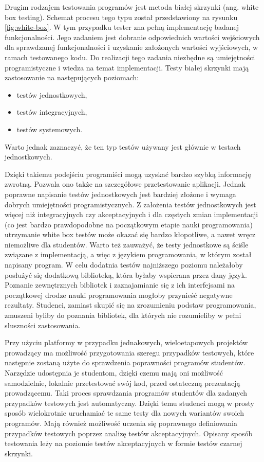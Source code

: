 Drugim rodzajem testowania programów jest metoda białej skrzynki (ang. white box testing).
Schemat procesu tego typu został przedstawiony na rysunku \ref{fig:white-box}.
W tym przypadku tester zna pełną implementację badanej funkcjonalności.
Jego zadaniem jest dobranie odpowiednich wartości wejściowych dla sprawdzanej funkcjonalności i uzyskanie założonych wartości wyjściowych, w ramach testowanego kodu.
Do realizacji tego zadania niezbędne są umiejętności programistyczne i wiedza na temat implementacji.
Testy białej skrzynki mają zastosowanie na następujących poziomach:
\begin{itemize}
    \item testów jednostkowych,
    \item testów integracyjnych,
    \item testów systemowych.
\end{itemize}
Warto jednak zaznaczyć, że ten typ testów używany jest głównie w testach jednostkowych.

Dzięki takiemu podejściu programiści mogą uzyskać bardzo szybką informację zwrotną.
Pozwala ono także na szczegółowe przetestowanie aplikacji.
Jednak poprawne napisanie testów jednostkowych jest bardziej złożone i wymaga dobrych umiejętności programistycznych.
Z założenia testów jednostkowych jest więcej niż integracyjnych czy akceptacyjnych i dla częstych zmian implementacji (co jest bardzo prawdopodobne na początkowym etapie nauki programowania) utrzymanie white box testów może okazać się bardzo kłopotliwe, a nawet wręcz niemożliwe dla studentów.
Warto też zauważyć, że testy jednostkowe są ściśle związane z implementacją, a więc z językiem programowania, w którym został napisany program.
W celu dodatnia testów najniższego poziomu należałoby posłużyć się dodatkową biblioteką, która byłaby wspierana przez dany język.
Poznanie zewnętrznych bibliotek i zaznajamianie się z ich interfejsami na początkowej drodze nauki programowania mogłoby przynieść negatywne rezultaty.
Studenci, zamiast skupić się na zrozumieniu podstaw programowania, zmuszeni byliby do poznania bibliotek, dla których nie rozumieliby w pełni słuszności zastosowania.

Przy użyciu platformy w przypadku jednakowych, wieloetapowych projektów prowadzący ma możliwość przygotowania szeregu przypadków testowych, które następnie zostaną użyte do sprawdzenia poprawności programów studentów.
Narzędzie udostępnia je studentom, dzięki czemu mają oni możliwość samodzielnie, lokalnie przetestować swój kod, przed ostateczną prezentacją prowadzącemu.
Taki proces sprawdzania programów studentów dla zadanych przypadków testowych jest automatyczny.
Dzięki temu studenci mogą w prosty sposób wielokrotnie uruchamiać te same testy dla nowych wariantów swoich programów.
Mają również możliwość uczenia się poprawnego definiowania przypadków testowych poprzez analizę testów akceptacyjnych.
Opisany sposób testowania leży na poziomie testów akceptacyjnych w formie testów czarnej skrzynki.

